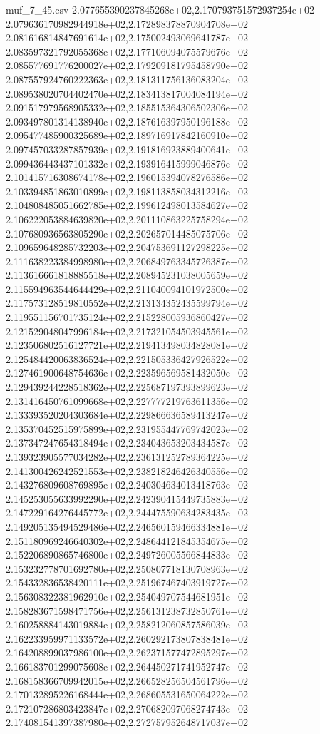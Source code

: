 \begin{filecontents*}{muf_7_45.csv}
2.077655390237845268e+02,2.170793751572937254e+02
2.079636170982944918e+02,2.172898378870904708e+02
2.081616814847691614e+02,2.175002493069641787e+02
2.083597321792055368e+02,2.177106094075579676e+02
2.085577691776200027e+02,2.179209181795458790e+02
2.087557924760222363e+02,2.181311756136083204e+02
2.089538020704402470e+02,2.183413817004084194e+02
2.091517979568905332e+02,2.185515364306502306e+02
2.093497801314138940e+02,2.187616397950196188e+02
2.095477485900325689e+02,2.189716917842160910e+02
2.097457033287857939e+02,2.191816923889400641e+02
2.099436443437101332e+02,2.193916415999046876e+02
2.101415716308674178e+02,2.196015394078276586e+02
2.103394851863010899e+02,2.198113858034312216e+02
2.104808485051662785e+02,2.199612498013584627e+02
2.106222053884639820e+02,2.201110863225758294e+02
2.107680936563805290e+02,2.202657014485075706e+02
2.109659648285732203e+02,2.204753691127298225e+02
2.111638223384998980e+02,2.206849763345726387e+02
2.113616661818885518e+02,2.208945231038005659e+02
2.115594963544644429e+02,2.211040094101972500e+02
2.117573128519810552e+02,2.213134352435599794e+02
2.119551156701735124e+02,2.215228005936860427e+02
2.121529048047996184e+02,2.217321054503945561e+02
2.123506802516127721e+02,2.219413498034828081e+02
2.125484420063836524e+02,2.221505336427926522e+02
2.127461900648754636e+02,2.223596569581432050e+02
2.129439244228518362e+02,2.225687197393899623e+02
2.131416450761099668e+02,2.227777219763611356e+02
2.133393520204303684e+02,2.229866636589413247e+02
2.135370452515975899e+02,2.231955447769742023e+02
2.137347247654318494e+02,2.234043653203434587e+02
2.139323905577034282e+02,2.236131252789364225e+02
2.141300426242521553e+02,2.238218246426340556e+02
2.143276809608769895e+02,2.240304634013418763e+02
2.145253055633992290e+02,2.242390415449735883e+02
2.147229164276445772e+02,2.244475590634283435e+02
2.149205135494529486e+02,2.246560159466334881e+02
2.151180969246640302e+02,2.248644121845354675e+02
2.152206890865746800e+02,2.249726005566844833e+02
2.153232778701692780e+02,2.250807718130708963e+02
2.154332836538420111e+02,2.251967467403919727e+02
2.156308322381962910e+02,2.254049707544681951e+02
2.158283671598471756e+02,2.256131238732850761e+02
2.160258884143019884e+02,2.258212060857586039e+02
2.162233959971133572e+02,2.260292173807838481e+02
2.164208899037986100e+02,2.262371577472895297e+02
2.166183701299075608e+02,2.264450271741952747e+02
2.168158366709942015e+02,2.266528256504561796e+02
2.170132895226168444e+02,2.268605531650064222e+02
2.172107286803423847e+02,2.270682097068274743e+02
2.174081541397387980e+02,2.272757952648717037e+02

\end{filecontents*}
